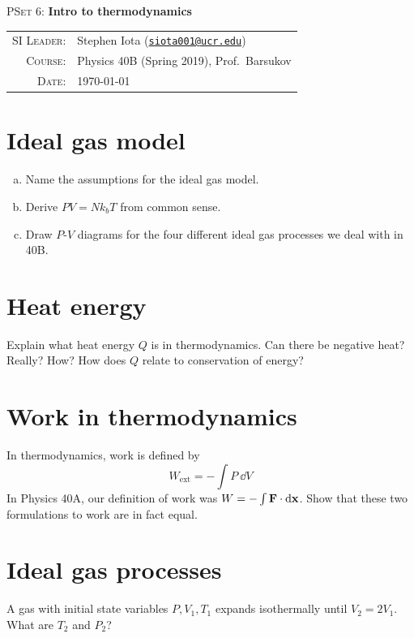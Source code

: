 \documentclass[11pt]{article}
\newcommand{\email}[1]{\texttt{\href{mailto:#1}{#1}}}
\begin{document}
\begin{center}
\Large{\textsc{PSet 6}: \textbf{Intro to thermodynamics}}
\end{center}
\vspace{.5mm}
\begin{tabular}{rl}
\textsc{SI Leader}:			& 			Stephen Iota (\email{siota001@ucr.edu})
\\
\textsc{Course}:				&			Physics 40B (Spring 2019), Prof.~Barsukov
\\
\textsc{Date}:					&			\today
\end{tabular}

\section{Ideal gas model}
\begin{enumerate}[(a)]
\item Name the assumptions for the ideal gas model.
\item Derive $PV = Nk_bT$ from common sense.
\item Draw $P$-$V$ diagrams for the four different ideal gas processes we deal with in 40B.
\end{enumerate}

\section{Heat energy}
Explain what heat energy $Q$ is in thermodynamics. Can there be negative heat? Really? How? How does $Q$ relate to conservation of energy?

\section{Work in thermodynamics}
In thermodynamics, work is defined by
\begin{equation}
W_\text{ext} = - \int P \ \dd V
\end{equation}
In Physics 40A, our definition of work was $W = - \int \vb{F}\cdot \dd \vb{x}$. Show that these two formulations to work are in fact equal.

\section{Ideal gas processes}
A gas with initial state variables $P, V_1, T_1$ expands isothermally until $V_2 = 2V_1$. What are $T_2$ and $P_2$?
\end{document}
